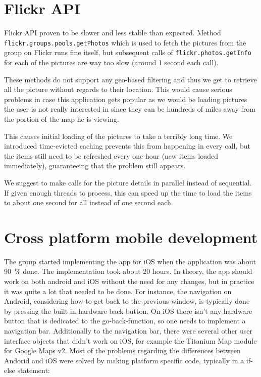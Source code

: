 \documentclass[11pt]{book}
\begin{document}
\section{Flickr API}
Flickr API proven to be slower and less stable than expected. Method \texttt{flickr.groups.pools.getPhotos} which is used to fetch the pictures from the group on Flickr runs fine itself, but subsequent calls of \texttt{flickr.photos.getInfo} for each of the pictures are way too slow (around 1 second each call).

These methods do not support any geo-based filtering and thus we get to retrieve all the picture without regards to their location. This would cause serious problems in case this application gets popular as we would be loading pictures the user is not really interested in since they can be hundreds of miles away from the portion of the map he is viewing.

This causes initial loading of the pictures to take a terribly long time. We introduced time-evicted caching prevents this from happening in every call, but the items still need to be refreshed every one hour (new items loaded immediately), guaranteeing that the problem still appears.

We suggest to make calls for the picture details in parallel instead of sequential. If given enough threads to process, this can speed up the time to load the items to about one second for all instead of one second each.


\section{Cross platform mobile development}
The group started implementing the app for iOS when the application was about 90~\% done. The implementation took about 20 hours. In theory, the app should work on both android and iOS without the need for any changes, but in practice it was quite a lot that needed to be done. For instance, the navigation on Android, considering how to get back to the previous window, is typically done by pressing the built in hardware back-button. On iOS there isn’t any hardware button that is dedicated to the go-back-function, so one needs to implement a navigation bar. Additionally to the navigation bar, there were several other user interface objects that didn’t work on iOS, for example the Titanium Map module for Google Maps v2. Most of the problems regarding the differences between Andorid and iOS were solved by making platform specific code, typically in a if-else statement:
\end{document}
